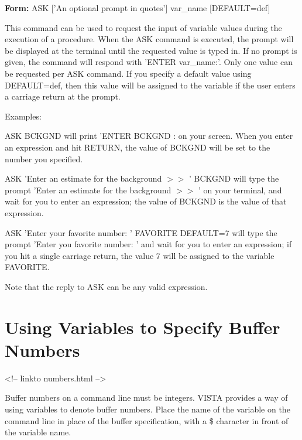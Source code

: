 \begin{command}
  \item[\textbf{Form: } ASK {['An optional prompt in quotes']} var\_name {[DEFAULT=def]}\hfill]{}
\end{command}

This command can be used to request the input of variable values during the
execution of a procedure.  When the ASK command is executed, the prompt
will be displayed at the terminal until the requested value is typed in.
If no prompt is given, the command will respond with 'ENTER var\_name:'.
Only one value can be requested per ASK command. If you specify a default
value using DEFAULT=def, then this value will be assigned to the variable
if the user enters a carriage return at the prompt.

Examples:
\begin{example}
  \item[ASK BCKGND\hfill]{will print 'ENTER BCKGND : on your screen.  When
       you enter an expression and hit RETURN, the value of BCKGND will be
       set to the number you specified.}

  \item[ASK 'Enter an estimate for the background $>>$ ' BCKGND \hfill]
       {will type the prompt 'Enter an estimate for the background $>>$ ' on
       your terminal, and wait for you to enter an expression; the value of
       BCKGND is the value of that expression.}

  \item[ASK 'Enter your favorite number: ' FAVORITE DEFAULT=7\hfill]
       { will type the prompt 'Enter you favorite number: ' and wait for
       you to enter an expression; if you hit a single carriage return, the
       value 7 will be assigned to the variable FAVORITE.}

\end{example}

Note that the reply to ASK can be any valid expression.

\section{Using Variables to Specify Buffer Numbers}
\begin{rawhtml}
<!-- linkto numbers.html -->
\end{rawhtml}

Buffer numbers on a command line must be integers.  VISTA provides a way of
using variables to denote buffer numbers.  Place the name of the variable
on the command line in place of the buffer specification, with a \$
character in front of the variable name.

